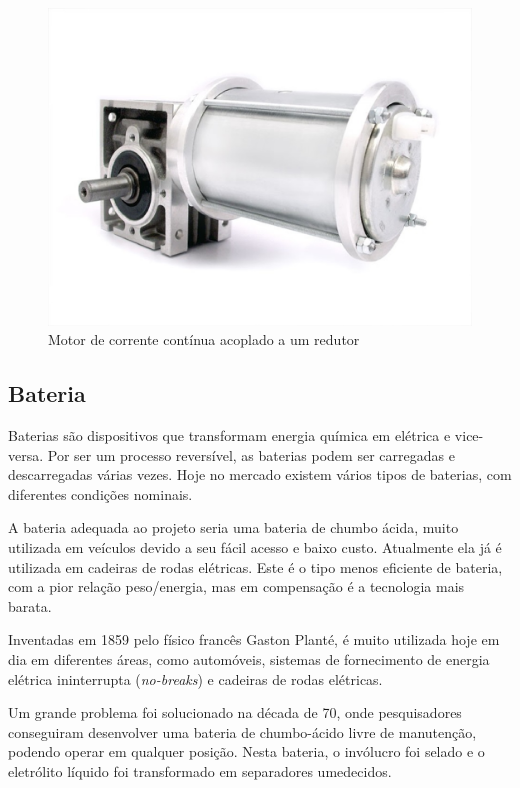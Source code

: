 \begin{figure}[!htb]
	\centering
	\includegraphics[keepaspectratio=true,scale=0.5]{figuras/referencialteorico/motor}
	\caption{Motor de corrente contínua acoplado a um redutor}
	\label{fig:motor}
\end{figure}

\subsection{Bateria}

Baterias são dispositivos que transformam energia química em elétrica e vice-versa. Por ser um processo reversível, as baterias podem ser carregadas e descarregadas várias vezes. Hoje no mercado existem vários tipos de baterias, com diferentes condições nominais.

A bateria adequada ao projeto seria uma bateria de chumbo ácida, muito utilizada em veículos devido a seu fácil acesso e baixo custo. Atualmente ela já é utilizada em cadeiras de rodas elétricas. Este é o tipo menos eficiente de bateria, com a pior relação peso/energia, mas em compensação é a tecnologia mais barata.

Inventadas em 1859 pelo físico francês Gaston Planté, é muito utilizada hoje em dia em diferentes áreas, como automóveis, sistemas de fornecimento de energia elétrica ininterrupta (\textit{no-breaks}) e cadeiras de rodas elétricas.

Um grande problema foi solucionado na década de 70, onde pesquisadores conseguiram desenvolver uma bateria de chumbo-ácido livre de manutenção, podendo operar em qualquer posição. Nesta bateria, o invólucro foi selado e o eletrólito líquido foi transformado em separadores umedecidos.

